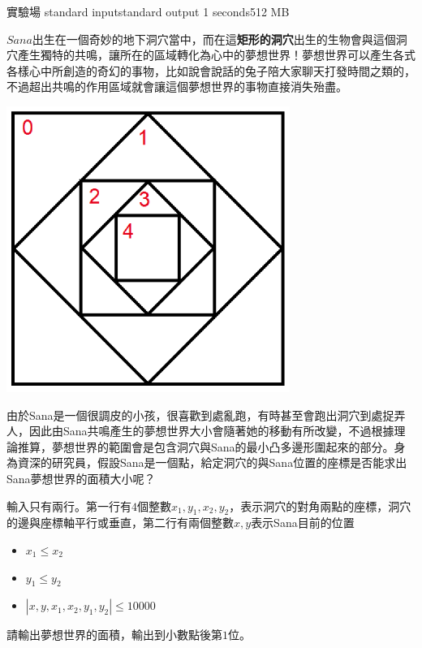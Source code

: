 \gdef\thisproblemauthor{}
\gdef\thisproblemdeveloper{}
\gdef\thisproblemorigin{}
\begin{problem}{實驗場}
{standard input}{standard output}
{1 seconds}{512 MB}{}

$Sana$出生在一個奇妙的地下洞穴當中，而在這\textbf{矩形的洞穴}出生的生物會與這個洞穴產生獨特的共鳴，讓所在的區域轉化為心中的夢想世界！夢想世界可以產生各式各樣心中所創造的奇幻的事物，比如說會說話的兔子陪大家聊天打發時間之類的，不過超出共鳴的作用區域就會讓這個夢想世界的事物直接消失殆盡。

\centerline{\includegraphics[scale=0.6]{./pics/A.png}}

由於Sana是一個很調皮的小孩，很喜歡到處亂跑，有時甚至會跑出洞穴到處捉弄人，因此由Sana共鳴產生的夢想世界大小會隨著她的移動有所改變，不過根據理論推算，夢想世界的範圍會是包含洞穴與Sana的最小凸多邊形圍起來的部分。身為資深的研究員，假設Sana是一個點，給定洞穴的與Sana位置的座標是否能求出Sana夢想世界的面積大小呢？

\InputFile

輸入只有兩行。第一行有$4$個整數$x_1,y_1,x_2,y_2$，表示洞穴的對角兩點的座標，洞穴的邊與座標軸平行或垂直，第二行有兩個整數$x,y$表示Sana目前的位置

\begin{iofmt}
\begin{itemize}
	\item $x_1\leq x_2$
	\item $y_1\leq y_2$
	\item $|x,y,x_1,x_2,y_1,y_2|\leq 10000$
\end{itemize}
\end{iofmt}

\OutputFile

請輸出夢想世界的面積，輸出到小數點後第$1$位。

\Examples

\begin{example}
%
\end{example}

\end{problem}
